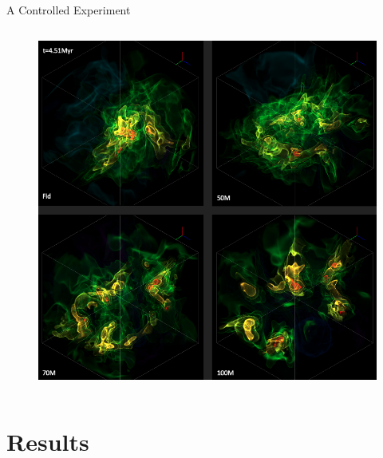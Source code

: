 \documentclass[aspectratio=169]{beamer}
\begin{document}
\begin{frame}{A Controlled Experiment}{}
\begin{columns}
\begin{column}{0.35\textwidth}
            \begin{figure}[h!]
                \centering
                \includegraphics[width=\linewidth]{../images/paper1-snapshot-volume-render.png} \\
		
                \label{fig:volume}
            \end{figure}
        \end{column}
    \end{columns}
\end{frame} 

\section{Results}
\end{document}
